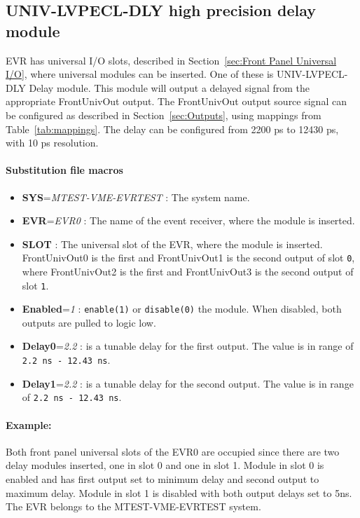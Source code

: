 \documentclass[12pt,a4paper]{article}
\begin{document}
  

\subsection{UNIV-LVPECL-DLY high precision delay module}\label{sec:UNIV-LVPECL-DLY}
EVR has universal I/O slots, described in Section~\ref{sec:Front Panel Universal I/O}, where universal modules can be inserted. One of these is UNIV-LVPECL-DLY Delay module. This module will output a delayed signal from the appropriate FrontUnivOut output. The FrontUnivOut output source signal can be configured as described in Section~\ref{sec:Outputs}, using mappings from Table~\ref{tab:mappings}. The delay can be configured from 2200 ps to 12430 ps, with 10 ps resolution. 


\paragraph{Substitution file macros}
\begin{itemize}
\item
	\textbf{SYS}=\emph{MTEST-VME-EVRTEST} : The system name.
\item
	\textbf{EVR}=\emph{EVR0} : The name of the event receiver, where the module is inserted.
\item
  \textbf{SLOT} : The universal slot of the EVR, where the module is inserted. FrontUnivOut0 is the first and FrontUnivOut1 is the second output of slot \texttt{0}, where FrontUnivOut2 is the first and FrontUnivOut3 is the second output of slot \texttt{1}.
\item
  \textbf{Enabled}=\emph{1} : \texttt{enable(1)} or \texttt{disable(0)} the module.
  When disabled, both outputs are pulled to logic low.
\item
  \textbf{Delay0}=\emph{2.2} : is a tunable delay for the first output. The value is
  in range of \texttt{2.2 ns - 12.43 ns}.
\item
  \textbf{Delay1}=\emph{2.2} : is a tunable delay for the second output. The value
  is in range of \texttt{2.2 ns - 12.43 ns}.
\end{itemize}

\paragraph{Example:} Both front panel universal slots of the EVR0 are occupied since there are
two delay modules inserted, one in slot 0 and one in slot 1. Module in
slot 0 is enabled and has first output set to minimum delay and second
output to maximum delay. Module in slot 1 is disabled with both output
delays set to 5ns. The EVR belongs to the MTEST-VME-EVRTEST system.
\end{document}
